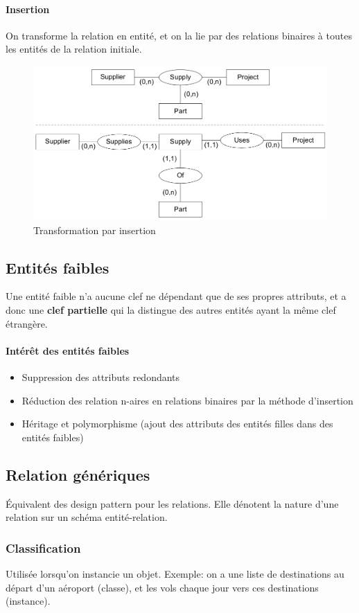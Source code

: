 \documentclass[a4paper]{article}
\begin{document}
\paragraph{Insertion}
On transforme la relation en entité, et on la lie par des relations binaires à
toutes les entités de la relation initiale.
\begin{figure}[H]
    \center
    \includegraphics[width=.6\textwidth]{fig/relation-naire-insertion.png}
    \caption{Transformation par insertion}
\end{figure}

\subsection{Entités faibles}
Une entité faible n'a aucune clef ne dépendant que de ses propres attributs, et
a donc une \textbf{clef partielle} qui la distingue des autres entités ayant la
même clef étrangère.

\paragraph{Intérêt des entités faibles}
\begin{itemize}
  \item Suppression des attributs redondants
  \item Réduction des relation n-aires en relations binaires par la méthode d'insertion
  \item Héritage et polymorphisme (ajout des attributs des entités filles dans des entités faibles)
\end{itemize}

\subsection{Relation génériques}
\'Equivalent des design pattern pour les relations. Elle dénotent la nature d'une
relation sur un schéma entité-relation.

\subsubsection{Classification}
Utilisée lorsqu'on instancie un objet. Exemple: on a une liste de destinations
au départ d'un aéroport (classe), et les vols chaque jour vers ces destinations (instance).
\end{document}
